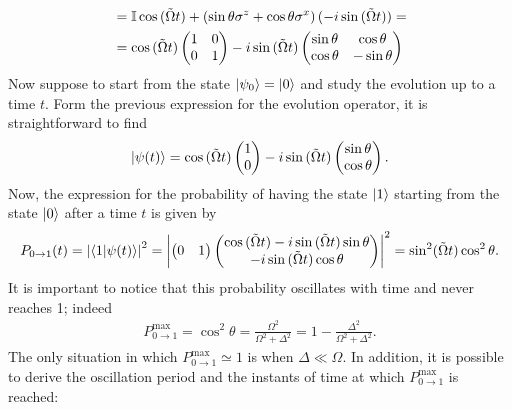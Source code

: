 \begin{tcolorbox}
\begin{align*}
    &= \mathbb{I} \cos{(\Tilde{\Omega}t)} + \left( \sin{\theta} \sigma^z + \cos{\theta} \sigma^x \right) (-i \sin{(\Tilde{\Omega}t})) = \\
    &= \cos{(\Tilde{\Omega}t)}  \begin{pmatrix} 1 & 0 \\ 0 & 1 \end{pmatrix} - i \sin{(\Tilde{\Omega}t)} \begin{pmatrix} \sin{\theta} & \cos{\theta} \\ \cos{\theta} & -\sin{\theta} \end{pmatrix} 
\end{align*}
Now suppose to start from the state $\ket{\psi_0} = \ket{0}$ and study the evolution up to a time $t$. Form the previous expression for the evolution operator, it is straightforward to find 
\begin{align*}
    \ket{\psi(t)} = \cos{(\Tilde{\Omega}t)} \begin{pmatrix} 1 \\ 0 \end{pmatrix} - i \sin{(\Tilde{\Omega}t)}  \begin{pmatrix} \sin{\theta} \\ \cos{\theta} \end{pmatrix}. 
\end{align*}
Now, the expression for the probability of having the state $\ket{1}$ starting from the state $\ket{0}$ after a time $t$ is given by 
\begin{align*}
    P_{0 \to 1}(t) = \abs{\braket{1}{\psi(t)}}^2 = \abs{\begin{pmatrix} 0 & 1 \end{pmatrix} \begin{pmatrix}  \cos{(\Tilde{\Omega}t)} - i \sin{(\Tilde{\Omega}t)} \sin{\theta} \\ -i \sin{(\Tilde{\Omega}t)} \cos{\theta} \end{pmatrix}}^2 = \sin^2(\Tilde{\Omega}t) \cos^2{\theta}.
\end{align*}
It is important to notice that this probability oscillates with time and never reaches 1; indeed 
\begin{align*}
    P_{0 \to 1}^\text{max} = \cos^2{\theta} = \frac{\Omega^2}{\Omega^2 + \Delta^2} = 1 - \frac{\Delta^2}{\Omega^2 + \Delta^2}. 
\end{align*}
The only situation in which $P_{0 \to 1}^\text{max} \simeq 1$ is when $\Delta \ll
 \Omega$. In addition, it is possible to derive the oscillation period and the instants of time at which $P_{0 \to 1}^\text{max}$ is reached: 

\end{tcolorbox}
